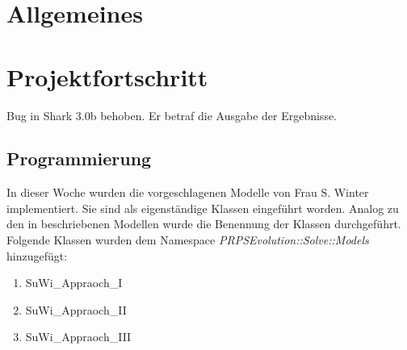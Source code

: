 \documentclass[a4paper,12pt,fleqn]{article}
\begin{document}
\setlength{\headheight}{36pt}

\begin{titlepage}



\end{titlepage}

\section[Allgemeines]{Allgemeines}
%
%
\section[Fortschritt]{Projektfortschritt}
%
Bug in Shark 3.0b behoben. Er betraf die Ausgabe der Ergebnisse.
%
\subsection{Programmierung}
%
In dieser Woche wurden die vorgeschlagenen Modelle von Frau S. Winter implementiert. Sie sind als eigenständige Klassen eingeführt worden. Analog zu den in \cite{WinAmed13} beschriebenen Modellen wurde die Benennung der Klassen durchgeführt. Folgende Klassen wurden dem Namespace \textit{PRPSEvolution::Solve::Models} hinzugefügt:
\begin{enumerate}
\item SuWi_Appraoch_I
\item SuWi_Appraoch_II
\item SuWi_Appraoch_III
\end{enumerate}

%
%
\end{document}
